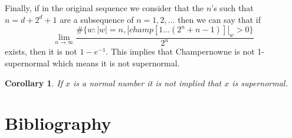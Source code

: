 \documentclass[11pt,a4paper]{tesis}
\newtheorem{corollary}{Corollary}[theorem]
\theoremstyle{definition}
\begin{document}
Finally, if in the original sequence we consider that the $n$'s such that $n = d + 2^d + 1$ are a subsequence of $n=1,2,\dots$ then we can say that if
$$\lim_{n\to\infty} \frac{\#\{w: |w| = n  , |champ[1...(2^n+n-1)]|_w > 0\}}{2^n}$$
exists, then it is not $1 - e^{-1}$.
This implies that Champernowne is not 1-supernormal which means it is not supernormal.

\begin{corollary}
If $x$ is a normal number it is not implied that $x$ is supernormal.
\end{corollary}



\chapter{Bibliography}
\backmatter


\end{document}
